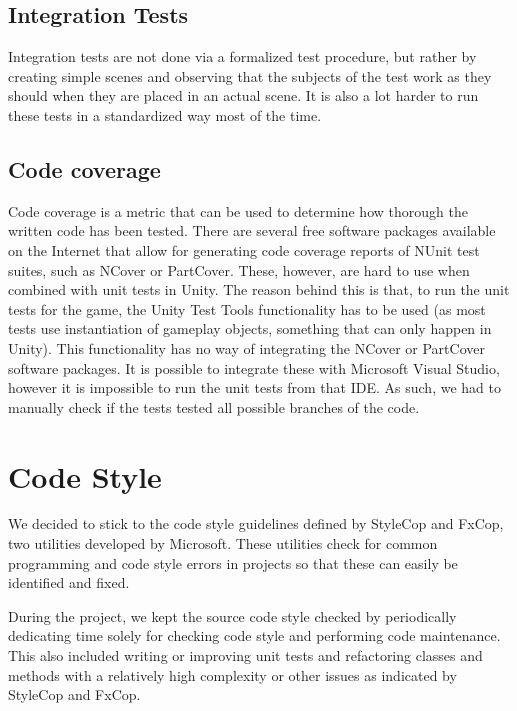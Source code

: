 		\subsection{Integration Tests} \label{ssec:integrationtests}
			Integration tests are not done via a formalized test procedure, but 
			rather by creating simple scenes and observing that the subjects of 
			the test work as they should when they are placed in an actual 
			scene. It is also a lot harder to run these tests in a standardized 
			way most of the time. 
		
		\subsection{Code coverage} \label{ssec:codecoverage}
			Code coverage is a metric that can be used to determine how thorough
			the written code has been tested. There are several free software
			packages available on the Internet that allow for generating code
			coverage reports of NUnit test suites, such as NCover or PartCover.
			These, however, are hard to use when combined with unit tests in
			Unity. The reason behind this is that, to run the unit tests for
			the game, the Unity Test Tools functionality has to be used (as most
			tests use instantiation of gameplay objects, something that can
			only happen in Unity). This functionality has no way of integrating
			the NCover or PartCover software packages. It is possible to integrate
			these with Microsoft Visual Studio, however it is impossible to run
			the unit tests from that IDE. As such, we had to manually check
			if the tests tested all possible branches of the code.
			
	\section{Code Style} \label{sec:codestyle}
		We decided to stick to the code style guidelines defined by StyleCop and 
		FxCop, two utilities developed by Microsoft. These utilities check for 
		common programming and code style errors in projects so that these can 
		easily be identified and fixed. 
		
		During the project, we kept the source code style checked by periodically
		dedicating time solely for checking code style and performing code 
		maintenance. This also included writing or improving unit tests and 
		refactoring classes and methods with a relatively high complexity or other 
		issues as indicated by StyleCop and FxCop.
		

